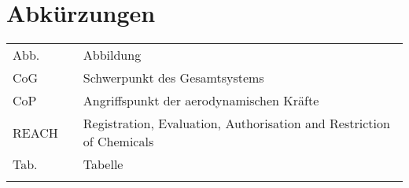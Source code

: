 \section*{Abkürzungen}
\begin{tabular}{lll}
\vspace{1mm}
  Abb.            &            & Abbildung \\
  \vspace{1mm}  
  CoG            &            & Schwerpunkt des Gesamtsystems \\
  \vspace{1mm}
  CoP            &           & Angriffspunkt der aerodynamischen Kräfte\\
  \vspace{1mm}
  REACH            &            & Registration, Evaluation, Authorisation and Restriction of Chemicals \\
  \vspace{1mm} 
  Tab.            &            & Tabelle \\
  \vspace{1mm}    
\end{tabular}